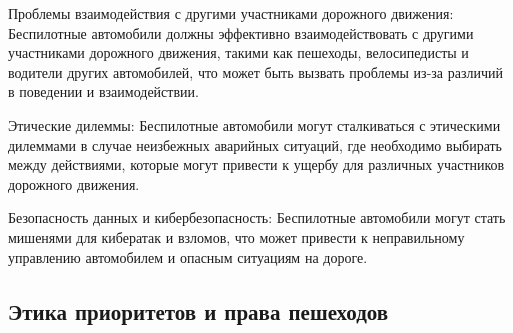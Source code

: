 \documentclass{article}
\begin{document}
\begin{itemize}
\begin{itemize}
        Проблемы взаимодействия с другими участниками дорожного движения: Беспилотные автомобили должны эффективно взаимодействовать с другими участниками дорожного движения, такими как пешеходы, велосипедисты и водители других автомобилей, что может быть вызвать проблемы из-за различий в поведении и взаимодействии.

        Этические дилеммы: Беспилотные автомобили могут сталкиваться с этическими дилеммами в случае неизбежных аварийных ситуаций, где необходимо выбирать между действиями, которые могут привести к ущербу для различных участников дорожного движения.

        Безопасность данных и кибербезопасность: Беспилотные автомобили могут стать мишенями для кибератак и взломов, что может привести к неправильному управлению автомобилем и опасным ситуациям на дороге.

        
    \end{itemize}
\end{itemize}


\subsection{Этика приоритетов и права пешеходов}
\end{document}
